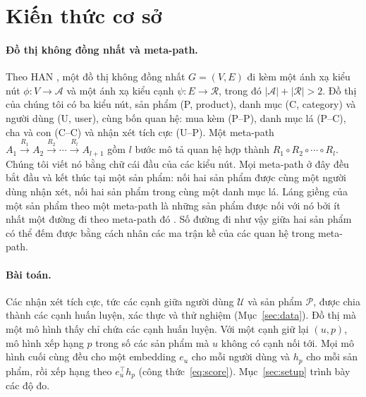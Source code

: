 \section{Kiến thức cơ sở}
\label{sec:prelim}

\paragraph{Đồ thị không đồng nhất và meta-path.} Theo HAN \citep{wang2019heterogeneous}, một
đồ thị không đồng nhất $G = (V, E)$ đi kèm một ánh xạ kiểu nút $\phi \colon V \to \mathcal{A}$ và
một ánh xạ kiểu cạnh $\psi \colon E \to \mathcal{R}$, trong đó $|\mathcal{A}| + |\mathcal{R}| > 2$.
Đồ thị của chúng tôi có ba kiểu nút, sản phẩm (P, product), danh mục (C, category) và người dùng
(U, user), cùng bốn quan hệ: mua kèm (P--P),
danh mục lá (P--C), cha và con (C--C) và nhận xét tích cực (U--P). Một meta-path
$A_1 \xrightarrow{R_1} A_2 \xrightarrow{R_2} \cdots \xrightarrow{R_l} A_{l+1}$ gồm $l$ bước mô tả
quan hệ hợp thành $R_1 \circ R_2 \circ \cdots \circ R_l$. Chúng tôi viết nó bằng chữ cái đầu của
các kiểu nút. Mọi meta-path ở đây đều bắt đầu và kết thúc tại một sản phẩm:  nối hai sản
phẩm được cùng một người dùng nhận xét,  nối hai sản phẩm trong cùng một danh mục lá.
Láng giềng của một sản phẩm theo một meta-path là những sản phẩm được nối với nó bởi ít nhất một
đường đi theo meta-path đó \citep{wang2019heterogeneous}. Số đường đi như vậy giữa hai sản phẩm có
thể đếm được bằng cách nhân các ma trận kề của các quan hệ trong meta-path.

\paragraph{Bài toán.} Các nhận xét tích cực, tức các cạnh giữa người dùng $\mathcal{U}$ và sản
phẩm $\mathcal{P}$, được chia thành các cạnh huấn luyện, xác thực và thử nghiệm
(Mục~\ref{sec:data}). Đồ thị mà một mô hình thấy chỉ chứa các cạnh huấn luyện. Với một cạnh
giữ lại $(u, p)$, mô hình xếp hạng $p$ trong số các sản phẩm mà $u$ không có cạnh nối tới. Mọi mô
hình cuối cùng đều cho một embedding $e_u$ cho mỗi người dùng và $h_p$ cho mỗi sản phẩm, rồi xếp hạng
theo $e_u^{\top} h_p$ (công thức~\ref{eq:score}). Mục~\ref{sec:setup} trình bày các độ đo.
